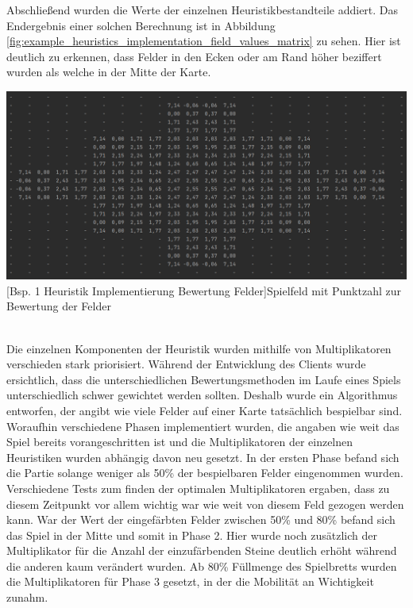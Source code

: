 \documentclass[12pt,a4paper,bibliography=totocnumbered,listof=totocnumbered]{article}
\begin{document}
Abschließend wurden die Werte der einzelnen Heuristikbestandteile addiert. Das Endergebnis einer solchen Berechnung ist in Abbildung \ref{fig:example_heuristics_implementation_field_values_matrix} zu sehen. Hier ist deutlich zu erkennen, dass Felder in den Ecken oder am Rand höher beziffert wurden als welche in der Mitte der Karte.

\vspace{1em}
\begin{minipage}{\linewidth}
	\centering
	\includegraphics[width=0.8\linewidth]{pics/heuristics_implementation_field_values_matrix.png}
	[Bsp. 1 Heuristik Implementierung Bewertung Felder]{Spielfeld mit Punktzahl zur Bewertung der Felder}
	\label{fig:example_heuristics_implementation_field_values_matrix}
\end{minipage} 
\\

Die einzelnen Komponenten der Heuristik wurden mithilfe von Multiplikatoren verschieden stark priorisiert. Während der Entwicklung des Clients wurde ersichtlich, dass die unterschiedlichen Bewertungsmethoden im Laufe eines Spiels unterschiedlich schwer gewichtet werden sollten. Deshalb wurde ein Algorithmus entworfen, der angibt wie viele Felder auf einer Karte tatsächlich bespielbar sind. Woraufhin verschiedene Phasen implementiert wurden, die angaben wie weit das Spiel bereits vorangeschritten ist und die Multiplikatoren der einzelnen Heuristiken wurden abhängig davon neu gesetzt. In der ersten Phase befand sich die Partie solange weniger als 50\% der bespielbaren Felder eingenommen wurden. Verschiedene Tests zum finden der optimalen Multiplikatoren ergaben, dass zu diesem Zeitpunkt vor allem wichtig war wie weit von diesem Feld gezogen werden kann. War der Wert der eingefärbten Felder zwischen 50\% und 80\% befand sich das Spiel in der Mitte und somit in Phase 2. Hier wurde noch zusätzlich der Multiplikator für die Anzahl der einzufärbenden Steine deutlich erhöht während die anderen kaum verändert wurden. Ab 80\% Füllmenge des Spielbretts wurden die Multiplikatoren für Phase 3 gesetzt, in der die Mobilität an Wichtigkeit zunahm.
 
\end{document}
